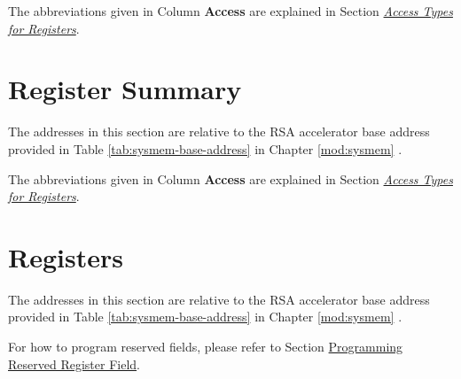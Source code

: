 \documentclass[main\_\_EN.tex]{subfiles}
\begin{document}
The abbreviations given in Column \textbf{Access} are explained in Section \hyperref[glossary-access-types]{\textit{Access Types for Registers}}.






\hypertarget{rsa-reg-summ}{}
\section{Register Summary}
\label{sec:rsa-reg-summ}


The addresses in this section are relative to the RSA accelerator base address provided in Table \ref{tab:sysmem-base-address} in Chapter \ref{mod:sysmem} \textit{}.

The abbreviations given in Column \textbf{Access} are explained in Section \hyperref[glossary-access-types]{\textit{Access Types for Registers}}.





\clearpage
\section{Registers}

The addresses in this section are relative to the RSA accelerator base address provided in Table \ref{tab:sysmem-base-address} in Chapter \ref{mod:sysmem} \textit{}.

For how to program reserved fields, please refer to Section \hyperref[programming-reserved-field]{Programming Reserved Register Field}.


\end{document}

